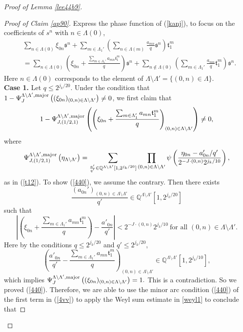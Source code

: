 \documentclass[11 pt,letterpaper]{amsart}
\theoremstyle{plain}
\theoremstyle{definition}
\theoremstyle{remark} \theoremstyle{exam} \theoremstyle{ob}
\numberwithin{equation}{section}
\begin{document}
\begin{proof}[Proof of Lemma \ref{lee44b9}]
\begin{proof}[Proof of Claim \ref{ap90}]
   Express the phase function of (\ref{kanj}),  to focus on the coefficients of $s^n$ with $n\in \Lambda(0)$,
	\begin{align}\label{4vv}
		& \sum_{n\in \Lambda(0)} \xi_{0n}\mathfrak{s}^n+ \sum_{m\in \Lambda_1'}\left(\sum_{n\in \Lambda(m)} \frac{a_{mn}}{q}\mathfrak{s}^n\right)\mathfrak{t}_1^{m}  \nonumber \\
		&=\sum_{n\in \Lambda(0)} \left( \xi_{0n}+ \frac{\sum_{m\in \Lambda_1'} a_{mn}\mathfrak{t}_1^{m}}{q} \right)\mathfrak{s}^{n}+ \sum_{n\notin  \Lambda(0)} \left(\sum_{m\in \Lambda_1'}\frac{a_{mn}}{q}\mathfrak{t}_1^{m}  \right)\mathfrak{s}^n. 
	\end{align}
	Here  $n\in \Lambda(0)$ corresponds to the element of $\Lambda\setminus \Lambda'=\{(0,n)\in\Lambda\}$.\\
\textbf{	Case 1.} Let  $q\le 2^{ j_k/20}$.  Under the  condition  that  $1-\Psi_J^{\Lambda\setminus \Lambda',\rm{major}}\left( (\xi_{0n})_{(0,n)\in\Lambda\setminus\Lambda'} \right)\neq 0$, we first claim  that
\begin{align}\label{440}
1- \Psi_{J,(1/2,1)}^{\Lambda\setminus \Lambda',\rm{major}}\left(\left(\xi_{0n}+ \frac{\sum_{m\in \Lambda_1'} a_{mn}\mathfrak{t}_1^{m}}{q}\right)_{(0,n)\in \Lambda\setminus \Lambda'}\right)\neq 0,
\end{align}
where 
$$\Psi_{J,(1/2,1)}^{\Lambda\setminus \Lambda',\rm{major}}\left(  \eta_{\Lambda\setminus\Lambda'}  \right)=\sum_{\frac{a'}{q'} \in  \mathbb{Q}^{\Lambda\setminus\Lambda'}[1,2^{j_k/20}]}\prod_{(0,n)\in\Lambda\setminus \Lambda'} \psi\left(  \frac{ \eta_{0n}-a'_{0n}/q'}{  2^{-J\cdot (0,n)}2^{j_k /10}} \right),$$ as in (\ref{t12}).
To show (\ref{440}), we 
assume the contrary. Then there exists $$ \frac{(a_{0n}')_{(0,n)\in \Lambda\setminus\Lambda'}}{q'}\in  \mathbb{Q}^{\Lambda\setminus\Lambda'}[1,2^{j_k/20}] $$
such that
$$\left| \left(\xi_{0n}+ \frac{\sum_{m\in \Lambda_1'} a_{mn}\mathfrak{t}_1^{m}}{q}\right)- \frac{a'_{0n}}{q'}\right|< 2^{-J\cdot (0,n)} 2^{j_k/10}\ \text{for all $(0,n)\in \Lambda\setminus \Lambda'$}.$$
Here by the conditions $q\le 2^{j_k/20}$ and $q'\le 2^{j_k/20}$,
$$ \left( \frac{a'_{0n}}{q'}- \frac{\sum_{m\in \Lambda_1'} a_{mn}\mathfrak{t}_1^{m}}{q}\right)_{(0,n)\in \Lambda\setminus\Lambda'}\in \mathbb{Q}^{\Lambda\setminus\Lambda'}[1,2^{j_k/10}], $$
which implies $\Psi_J^{\Lambda\setminus \Lambda',\rm{major}}\left( (\xi_{0n})_{(0,n)\in\Lambda\setminus\Lambda'} \right)=1.$ This is a contradiction.  So we proved (\ref{440}).
Therefore, we are able to use the minor arc condition (\ref{440}) of the first term in (\ref{4vv})   to apply the Weyl sum estimate  in \eqref{weyl1}  to conclude that  

\end{proof}
\end{proof}
\end{document}
